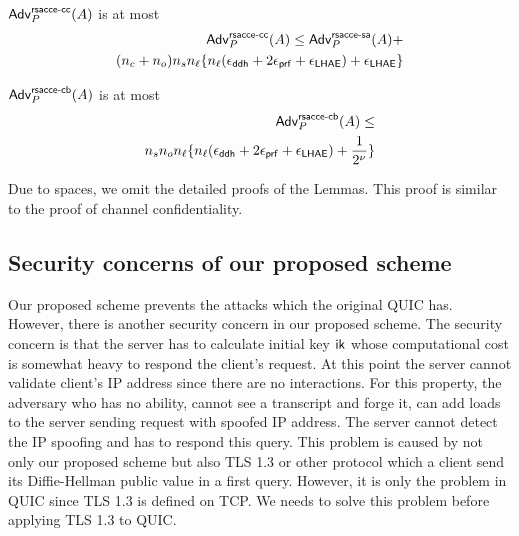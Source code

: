 \begin{lemma} \label{lemma:proposed_scheme_rsacce-cc}
 $\mathsf{Adv}^{\mathsf{rsacce\textsc{-} cc}}_{P}(A)$ is at most
 \begin{eqnarray}
  \mathsf{Adv}^{\mathsf{rsacce\textsc{-} cc}}_{P}(A) \leq \mathsf{Adv}^{\mathsf{rsacce\textsc{-} sa}}_{P}(A) + \nonumber \\
  (n_c + n_o) n_s n_{\ell} \{ n_{\ell}(\epsilon_{\mathsf{ddh}} + 2\epsilon_{\mathsf{prf}} + \epsilon_{\mathsf{LHAE}})
  + \epsilon_{\mathsf{LHAE}} \}
 \end{eqnarray}
\end{lemma}
%


\begin{lemma} \label{lemma:proposed_scheme_rsacce-cb}
 $\mathsf{Adv}^{\mathsf{rsacce\textsc{-} cb}}_{P}(A)$ is at most
 \begin{eqnarray}
  \mathsf{Adv}^{\mathsf{rsacce\textsc{-} cb}}_{P}(A) \leq \nonumber \\
  n_s n_o n_{\ell} \{ n_{\ell}(\epsilon_{\mathsf{ddh}} + 2\epsilon_{\mathsf{prf}} + \epsilon_{\mathsf{LHAE}}) + \frac{1}{2^{\nu}} \}
 \end{eqnarray}
\end{lemma}
%
Due to spaces, we omit the detailed proofs of the Lemmas.
This proof is similar to the proof of channel confidentiality.

\subsection{Security concerns of our proposed scheme} \label{sec:prop_sec_concerns}

Our proposed scheme prevents the attacks which the original QUIC has.
However, there is another security concern in our proposed scheme.
The security concern is that the server has to calculate initial
key $\mathsf{ik}$ whose computational cost is somewhat heavy to respond the
client's request.
At this point the server cannot validate client's IP address since
there are no interactions.
For this property, the adversary who has no ability, cannot see a
transcript and forge it, can add loads to the server sending request
with spoofed IP address.
The server cannot detect the IP spoofing and has to respond this query.
This problem is caused by not only our proposed scheme but also TLS 1.3
or other protocol which a client send its Diffie-Hellman public value
in a first query.
However, it is only the problem in QUIC since TLS 1.3 is defined on TCP.
We needs to solve this problem before applying TLS 1.3 to QUIC.

